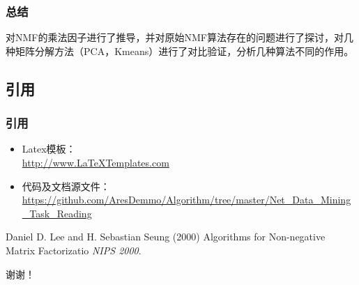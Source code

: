 \documentclass[UTF8,mathserif]{beamer}
\begin{document}
\begin{frame}
\frametitle{总结}
\indent 对NMF的乘法因子进行了推导，并对原始NMF算法存在的问题进行了探讨，对几种矩阵分解方法（PCA，Kmeans）进行了对比验证，分析几种算法不同的作用。
\end{frame}

\subsection{引用}

\begin{frame}
\frametitle{引用}

\begin{itemize}
	\item Latex模板：\\
		\url{http://www.LaTeXTemplates.com}
	\item 代码及文档源文件：\\
		\url{https://github.com/AresDemmo/Algorithm/tree/master/Net_Data_Mining_Task_Reading}
\end{itemize}

\footnotesize{
\begin{thebibliography}{99} %
	 Daniel D. Lee and H. Sebastian Seung (2000)
	\newblock Algorithms for Non-negative Matrix Factorizatio
	\newblock \emph{NIPS 2000}.
\end{thebibliography}
}
\end{frame}


\begin{frame}
\Huge{\centerline{谢谢！}}
\end{frame}

\end{document}
